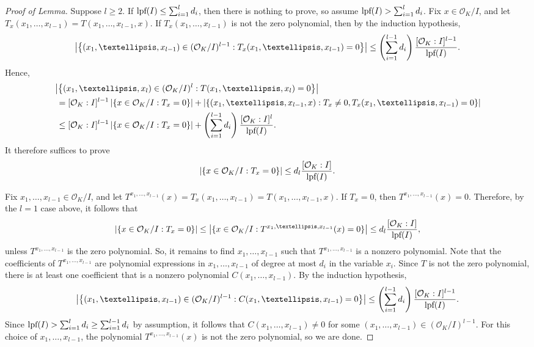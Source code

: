 \documentclass[10pt,a4paper]{amsart}
\newcommand{\lpf}{\normalfont\text{lpf}}
\newcommand{\mO}{\mathcal{O}}
\begin{document}
\begin{proof}[Proof of Lemma]
		Suppose $l \ge 2$.
		If $\lpf(I) \le \sum_{i=1}^l{d_i}$, then there is nothing to prove, so assume $\lpf(I) > \sum_{i=1}^l{d_i}$.
		Fix $x \in \mO_K/I$, and let $T_x(x_1, \dots, x_{l-1}) = T(x_1, \dots, x_{l-1}, x)$.
		If $T_x(x_1, \dots, x_{l-1})$ is not the zero polynomial, then by the induction hypothesis,
		\begin{equation*}
			\left| \left\{ (x_1, \dots, x_{l-1}) \in (\mO_K/I)^{l-1} : T_x(x_1, \dots, x_{l-1}) = 0 \right\} \right| \le \left( \sum_{i=1}^{l-1}{d_i} \right) \frac{[\mO_K:I]^{l-1}}{\lpf(I)}.
		\end{equation*}
		Hence,
		\begin{align*}
			& \left| \left\{ (x_1, \dots, x_l) \in (\mO_K/I)^l : T(x_1, \dots, x_l) = 0 \right\} \right| \\
			 &~= [\mO_K:I]^{l-1} \left| \{x \in \mO_K/I : T_x = 0\} \right|
			 + \left| \{(x_1, \dots, x_{l-1}, x) : T_x \ne 0, T_x(x_1, \dots, x_{l-1}) = 0\} \right| \\
			 &~\le [\mO_K:I]^{l-1} \left| \{x \in \mO_K/I : T_x = 0\} \right| + \left( \sum_{i=1}^{l-1}{d_i} \right) \frac{[\mO_K:I]^l}{\lpf(I)}.
		\end{align*}
		It therefore suffices to prove
		\begin{equation*}
			\left| \{x \in \mO_K/I : T_x = 0\} \right| \le d_l \frac{[\mO_K:I]}{\lpf(I)}.
		\end{equation*}
		
		Fix $x_1, \dots, x_{l-1} \in \mO_K/I$, and let $T^{x_1, \dots, x_{l-1}}(x) = T_x(x_1, \dots, x_{l-1}) = T(x_1, \dots, x_{l-1}, x)$.
		If $T_x = 0$, then $T^{x_1, \dots, x_{l-1}}(x) = 0$.
		Therefore, by the $l=1$ case above, it follows that
		\begin{equation*}
			\left| \{x \in \mO_K/I : T_x = 0\} \right|
			 \le \left| \{x \in \mO_K/I : T^{x_1, \dots, x_{l-1}}(x) = 0\} \right|
			 \le d_l \frac{[\mO_K:I]}{\lpf(I)},
		\end{equation*}
		unless $T^{x_1, \dots, x_{l-1}}$ is the zero polynomial.
		So, it remains to find $x_1, \dots, x_{l-1}$ such that $T^{x_1, \dots, x_{l-1}}$ is a nonzero polynomial.
		Note that the coefficients of $T^{x_1, \dots, x_{l-1}}$ are polynomial expressions in $x_1, \dots, x_{l-1}$ of degree at most $d_i$ in the variable $x_i$.
		Since $T$ is not the zero polynomial, there is at least one coefficient that is a nonzero polynomial $C(x_1, \dots, x_{l-1})$.
		By the induction hypothesis,
		\begin{equation*}
			\left| \left\{ (x_1, \dots, x_{l-1}) \in (\mO_K/I)^{l-1} : C(x_1, \dots, x_{l-1}) = 0 \right\} \right|
			 \le \left( \sum_{i=1}^{l-1}{d_i} \right) \frac{[\mO_K:I]^{l-1}}{\lpf(I)}.
		\end{equation*}
		Since $\lpf(I) > \sum_{i=1}^l{d_i} \ge \sum_{i=1}^{l-1}{d_i}$ by assumption, it follows that $C(x_1, \dots, x_{l-1}) \ne 0$ for some $(x_1, \dots, x_{l-1}) \in (\mO_K/I)^{l-1}$.
		For this choice of $x_1, \dots, x_{l-1}$, the polynomial $T^{x_1, \dots, x_{l-1}}(x)$ is not the zero polynomial, so we are done.
	\end{proof}
\end{document}
